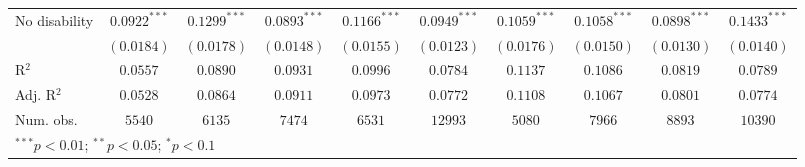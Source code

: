 \documentclass{article}
\begin{document}
\begin{table}
\begin{center}
\begin{tabular}{l c c c c c c c c c}
No disability                  & $0.0922^{***}$  & $0.1299^{***}$  & $0.0893^{***}$  & $0.1166^{***}$  & $0.0949^{***}$  & $0.1059^{***}$  & $0.1058^{***}$  & $0.0898^{***}$  & $0.1433^{***}$  \\
                               & $(0.0184)$      & $(0.0178)$      & $(0.0148)$      & $(0.0155)$      & $(0.0123)$      & $(0.0176)$      & $(0.0150)$      & $(0.0130)$      & $(0.0140)$      \\
\hline
R$^2$                          & $0.0557$        & $0.0890$        & $0.0931$        & $0.0996$        & $0.0784$        & $0.1137$        & $0.1086$        & $0.0819$        & $0.0789$        \\
Adj. R$^2$                     & $0.0528$        & $0.0864$        & $0.0911$        & $0.0973$        & $0.0772$        & $0.1108$        & $0.1067$        & $0.0801$        & $0.0774$        \\
Num. obs.                      & $5540$          & $6135$          & $7474$          & $6531$          & $12993$         & $5080$          & $7966$          & $8893$          & $10390$         \\
\hline
\multicolumn{10}{l}{\scriptsize{$^{***}p<0.01$; $^{**}p<0.05$; $^{*}p<0.1$}}
\end{tabular}
\end{center}
\end{table}
\end{document}

